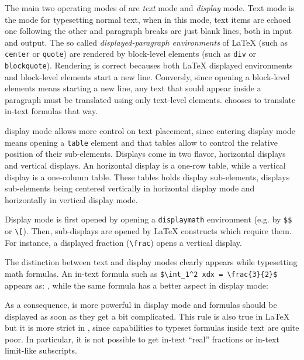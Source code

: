 The main two operating modes of \hevea{} are \emph{text} mode and
\emph{display} mode.
Text mode is the mode for typesetting normal text,
when in this mode, text items are echoed one following the other and
paragraph breaks are just blank lines, both in input and output.
The so called \emph{displayed-paragraph environments} of \LaTeX{} (such as
\texttt{center} or \texttt{quote}) are rendered by \html{} block-level
elements (such as \texttt{div} or \texttt{blockquote}).
Rendering is correct becauses both \LaTeX{} displayed environments and
\html{} block-level elements start a new line.
Conversly, since opening a \html{} block-level elements means starting
a new line, any text that sould appear inside a paragraph must be
translated using only \html{} text-level elements.
\hevea{} chooses to translate in-text formulas that way.


\hevea{} display mode allows more control on text placement, since
entering display mode means opening
a \html{} \verb+table+ element and that tables allow to control the
relative position of their sub-elements.
Displays come in two flavor, horizontal displays and vertical
displays.
An horizontal display is a one-row table, while a vertical display is
a one-column table. These tables holds display sub-elements, displays
sub-elements being centered vertically in horizontal display mode and
horizontally in vertical display mode.

Display mode is first opened by opening a \verb+displaymath+ environment
(e.g. by \verb+$$+
or \verb+\[+).
Then, sub-displays are opened by \LaTeX{} constructs which require
them.
For instance, a displayed  fraction (\verb+\frac+) opens a vertical display.

The distinction between text and display modes clearly appears while
typesetting math formulas.
An in-text formula such as
\verb+$\int_1^2 xdx = \frac{3}{2}$+ appears as:
,
while the same formula has a better aspect in display mode:
\begin{center}
\end{center}
As a consequence, \hevea{} is more powerful in display mode and
formulas should be displayed as soon as they get a bit complicated.
This rule is also true in \LaTeX{} but it is more strict in \hevea{},
since \html{} capabilities to typeset formulas inside text are quite
poor.
In particular, it is not possible to get in-text ``real'' fractions or
in-text limit-like subscripts.

